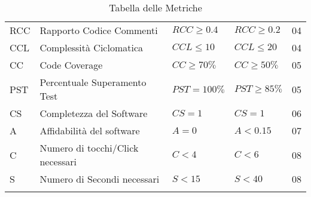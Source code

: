 \begin{longtable}{
		>{\centering}p{}
		>{}p{}
        >{\centering}p{}
        >{\centering}p{}
        >{}p{} }
            RCC & Rapporto Codice Commenti & $RCC \geq 0.4$ & $RCC \geq 0.2$  & 04 \\

            CCL & Complessità Ciclomatica & $CCL \leq 10 $ & $CCL \leq 20 $& 04 \\

            CC & Code Coverage & $CC\geq 70\%$ & $CC\geq 50\%$ & 05 \\

            PST & Percentuale Superamento Test & $PST=100\%$ & $PST\geq85\%$ & 05 \\

            CS & Completezza del Software & $CS=1$ & $CS=1$ & 06 \\

            A & Affidabilità del software & $A=0$ & $A < 0.15$ & 07 \\

            C & Numero di tocchi/Click necessari & $C<4$ & $C<6$& 08 \\

            S & Numero di Secondi necessari & $S<15$ & $S<40$ & 08 \\


           \caption{Tabella delle Metriche}
        \end{longtable}


